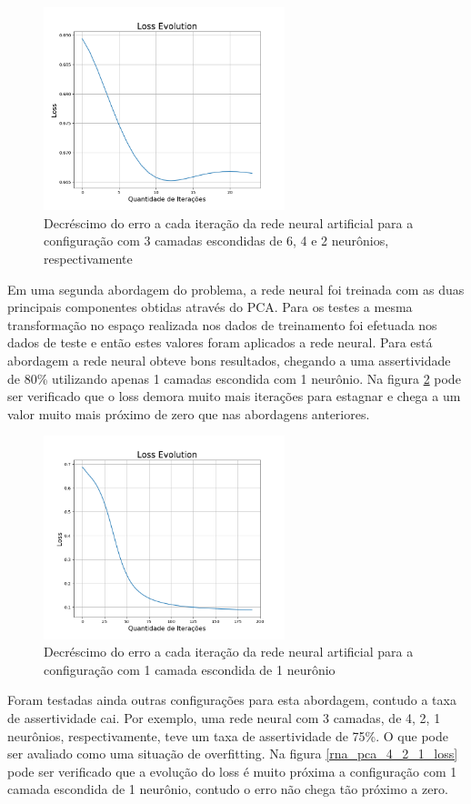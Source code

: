 \documentclass{article}
\begin{document}
\begin{figure}[ht]
\centering
\includegraphics[width=7cm]{rna_10_8_6_loss}
\caption{Decréscimo do erro a cada iteração da rede neural artificial para a configuração com 3 camadas escondidas de 6, 4 e 2 neurônios, respectivamente}
\label{rna_10_8_6_loss}
\end{figure}

Em uma segunda abordagem do problema, a rede neural foi treinada com as duas principais componentes obtidas através do PCA. Para os testes a mesma transformação no espaço realizada nos dados de treinamento foi efetuada nos dados de teste e então estes valores foram aplicados a rede neural. Para está abordagem a rede neural obteve bons resultados, chegando a uma assertividade de 80\% utilizando apenas 1 camadas escondida com 1 neurônio. Na figura \ref{rna_pca_1_loss} pode ser verificado que o loss demora muito mais iterações para estagnar e chega a um valor muito mais próximo de zero que nas abordagens anteriores.

\begin{figure}[ht]
\centering
\includegraphics[width=7cm]{rna_pca_1_loss}
\caption{Decréscimo do erro a cada iteração da rede neural artificial para a configuração com 1 camada escondida de 1 neurônio}
\label{rna_pca_1_loss}
\end{figure}

\vspace{4cm}
Foram testadas ainda outras configurações para esta abordagem, contudo a taxa de assertividade cai. Por exemplo, uma rede neural com 3 camadas, de 4, 2, 1 neurônios, respectivamente, teve um taxa de assertividade de 75\%. O que pode ser avaliado como uma situação de overfitting. Na figura \ref{rna_pca_4_2_1_loss} pode ser verificado que a evolução do loss é muito próxima a configuração com 1 camada escondida de 1 neurônio, contudo o erro não chega tão próximo a zero.
\end{document}
